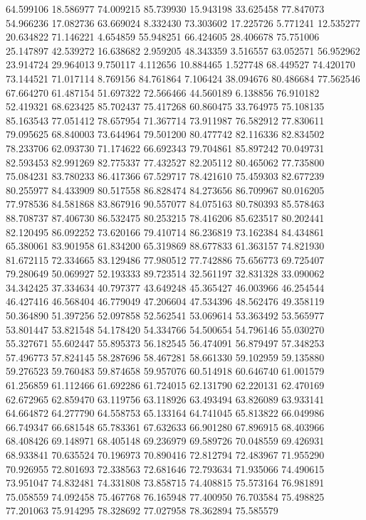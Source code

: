 64.599106
18.586977
74.009215
85.739930
15.943198
33.625458
77.847073
54.966236
17.082736
63.669024
8.332430
73.303602
17.225726
5.771241
12.535277
20.634822
71.146221
4.654859
55.948251
66.424605
28.406678
75.751006
25.147897
42.539272
16.638682
2.959205
48.343359
3.516557
63.052571
56.952962
23.914724
29.964013
9.750117
4.112656
10.884465
1.527748
68.449527
74.420170
73.144521
71.017114
8.769156
84.761864
7.106424
38.094676
80.486684
77.562546
67.664270
61.487154
51.697322
72.566466
44.560189
6.138856
76.910182
52.419321
68.623425
85.702437
75.417268
60.860475
33.764975
75.108135
85.163543
77.051412
78.657954
71.367714
73.911987
76.582912
77.830611
79.095625
68.840003
73.644964
79.501200
80.477742
82.116336
82.834502
78.233706
62.093730
71.174622
66.692343
79.704861
85.897242
70.049731
82.593453
82.991269
82.775337
77.432527
82.205112
80.465062
77.735800
75.084231
83.780233
86.417366
67.529717
78.421610
75.459303
82.677239
80.255977
84.433909
80.517558
86.828474
84.273656
86.709967
80.016205
77.978536
84.581868
83.867916
90.557077
84.075163
80.780393
85.578463
88.708737
87.406730
86.532475
80.253215
78.416206
85.623517
80.202441
82.120495
86.092252
73.620166
79.410714
86.236819
73.162384
84.434861
65.380061
83.901958
61.834200
65.319869
88.677833
61.363157
74.821930
81.672115
72.334665
83.129486
77.980512
77.742886
75.656773
69.725407
79.280649
50.069927
52.193333
89.723514
32.561197
32.831328
33.090062
34.342425
37.334634
40.797377
43.649248
45.365427
46.003966
46.254544
46.427416
46.568404
46.779049
47.206604
47.534396
48.562476
49.358119
50.364890
51.397256
52.097858
52.562541
53.069614
53.363492
53.565977
53.801447
53.821548
54.178420
54.334766
54.500654
54.796146
55.030270
55.327671
55.602447
55.895373
56.182545
56.474091
56.879497
57.348253
57.496773
57.824145
58.287696
58.467281
58.661330
59.102959
59.135880
59.276523
59.760483
59.874658
59.957076
60.514918
60.646740
61.001579
61.256859
61.112466
61.692286
61.724015
62.131790
62.220131
62.470169
62.672965
62.859470
63.119756
63.118926
63.493494
63.826089
63.933141
64.664872
64.277790
64.558753
65.133164
64.741045
65.813822
66.049986
66.749347
66.681548
65.783361
67.632633
66.901280
67.896915
68.403966
68.408426
69.148971
68.405148
69.236979
69.589726
70.048559
69.426931
68.933841
70.635524
70.196973
70.890416
72.812794
72.483967
71.955290
70.926955
72.801693
72.338563
72.681646
72.793634
71.935066
74.490615
73.951047
74.832481
74.331808
73.858715
74.408815
75.573164
76.981891
75.058559
74.092458
75.467768
76.165948
77.400950
76.703584
75.498825
77.201063
75.914295
78.328692
77.027958
78.362894
75.585579
